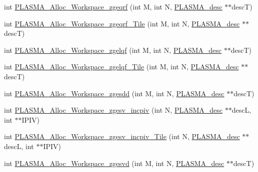 \begin{DoxyCompactItemize}
\item 
int \hyperlink{group__Auxiliary_ga8a958de76438d98505a72de551a7d957_ga8a958de76438d98505a72de551a7d957}{P\+L\+A\+S\+M\+A\+\_\+\+Alloc\+\_\+\+Workspace\+\_\+zgeqrf} (int M, int N, \hyperlink{structplasma__desc__t}{P\+L\+A\+S\+M\+A\+\_\+desc} $\ast$$\ast$desc\+T)
\item 
int \hyperlink{group__Auxiliary_ga82ac597de602f1b5c9cd52553980c6a2_ga82ac597de602f1b5c9cd52553980c6a2}{P\+L\+A\+S\+M\+A\+\_\+\+Alloc\+\_\+\+Workspace\+\_\+zgeqrf\+\_\+\+Tile} (int M, int N, \hyperlink{structplasma__desc__t}{P\+L\+A\+S\+M\+A\+\_\+desc} $\ast$$\ast$desc\+T)
\item 
int \hyperlink{group__Auxiliary_ga90628da9a02043e14caa77c9c2ffd54c_ga90628da9a02043e14caa77c9c2ffd54c}{P\+L\+A\+S\+M\+A\+\_\+\+Alloc\+\_\+\+Workspace\+\_\+zgelqf} (int M, int N, \hyperlink{structplasma__desc__t}{P\+L\+A\+S\+M\+A\+\_\+desc} $\ast$$\ast$desc\+T)
\item 
int \hyperlink{group__Auxiliary_ga78c837bb54673ebb86374a5684c40a2c_ga78c837bb54673ebb86374a5684c40a2c}{P\+L\+A\+S\+M\+A\+\_\+\+Alloc\+\_\+\+Workspace\+\_\+zgelqf\+\_\+\+Tile} (int M, int N, \hyperlink{structplasma__desc__t}{P\+L\+A\+S\+M\+A\+\_\+desc} $\ast$$\ast$desc\+T)
\item 
int \hyperlink{group__Auxiliary_ga5c79019be55b79632ac38b06deddeccc_ga5c79019be55b79632ac38b06deddeccc}{P\+L\+A\+S\+M\+A\+\_\+\+Alloc\+\_\+\+Workspace\+\_\+zgesdd} (int M, int N, \hyperlink{structplasma__desc__t}{P\+L\+A\+S\+M\+A\+\_\+desc} $\ast$$\ast$desc\+T)
\item 
int \hyperlink{group__Auxiliary_gac3b6425ec67bf03af36837bb183b6065_gac3b6425ec67bf03af36837bb183b6065}{P\+L\+A\+S\+M\+A\+\_\+\+Alloc\+\_\+\+Workspace\+\_\+zgesv\+\_\+incpiv} (int N, \hyperlink{structplasma__desc__t}{P\+L\+A\+S\+M\+A\+\_\+desc} $\ast$$\ast$desc\+L, int $\ast$$\ast$I\+P\+I\+V)
\item 
int \hyperlink{group__Auxiliary_ga9c7db2b0bd13dd4429a48a3a75c2d73a_ga9c7db2b0bd13dd4429a48a3a75c2d73a}{P\+L\+A\+S\+M\+A\+\_\+\+Alloc\+\_\+\+Workspace\+\_\+zgesv\+\_\+incpiv\+\_\+\+Tile} (int N, \hyperlink{structplasma__desc__t}{P\+L\+A\+S\+M\+A\+\_\+desc} $\ast$$\ast$desc\+L, int $\ast$$\ast$I\+P\+I\+V)
\item 
int \hyperlink{group__Auxiliary_ga1bd8a575f0871a1882f4b3d63aab367a_ga1bd8a575f0871a1882f4b3d63aab367a}{P\+L\+A\+S\+M\+A\+\_\+\+Alloc\+\_\+\+Workspace\+\_\+zgesvd} (int M, int N, \hyperlink{structplasma__desc__t}{P\+L\+A\+S\+M\+A\+\_\+desc} $\ast$$\ast$desc\+T)
\item 

\end{DoxyCompactItemize}
